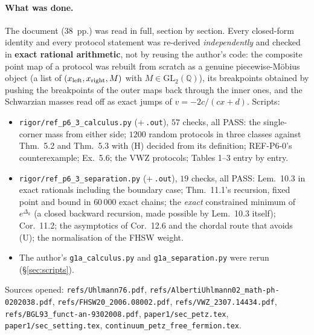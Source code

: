 \documentclass[11pt]{article}
\theoremstyle{definition}\newtheorem{example}[theorem]{Example}
\begin{document}
\paragraph{What was done.}
The document (38~pp.) was read in full, section by section.  Every closed-form identity
and every protocol statement was re-derived \emph{independently} and checked in
\textbf{exact rational arithmetic}, not by reusing the author's code: the composite point
map of a protocol was rebuilt from scratch as a genuine piecewise-M\"obius object (a list
of $(x_{\rm left},x_{\rm right},M)$ with $M\in\mathrm{GL}_2(\mathbb Q)$), its breakpoints
obtained by pushing the breakpoints of the outer maps back through the inner ones, and the
Schwarzian masses read off as exact jumps of $v=-2c/(cx+d)$.  Scripts:
\begin{itemize}[leftmargin=2em,nosep]
\item \texttt{rigor/ref\_p6\_3\_calculus.py} (+\,\texttt{.out}), $57$ checks, all PASS:
 the single-corner mass from either side; $1200$ random protocols in three classes against
 Thm.~5.2 and Thm.~5.3 with (H) decided from its definition; REF-P6-0's counterexample;
 Ex.~5.6; the VWZ protocols; Tables 1--3 entry by entry.
\item \texttt{rigor/ref\_p6\_3\_separation.py} (+\,\texttt{.out}), $19$ checks, all PASS:
 Lem.~10.3 in exact rationals including the boundary case; Thm.~11.1's recursion, fixed
 point and bound in $60\,000$ exact chains; the \emph{exact} constrained minimum of
 $e^{\Delta_k}$ (a closed backward recursion, made possible by Lem.~10.3 itself);
 Cor.~11.2; the asymptotics of Cor.~12.6 and the chordal route that avoids (U); the
 normalisation of the FHSW weight.
\item The author's \texttt{g1a\_calculus.py} and \texttt{g1a\_separation.py} were rerun
 (\S\ref{sec:scripts}).
\end{itemize}
Sources opened: \texttt{refs/Uhlmann76.pdf}, \texttt{refs/AlbertiUhlmann02\_math-ph-0202038.pdf},
\texttt{refs/FHSW20\_2006.08002.pdf}, \texttt{refs/VWZ\_2307.14434.pdf},
\texttt{refs/BGL93\_funct-an-9302008.pdf}, \texttt{paper1/sec\_petz.tex},
\texttt{paper1/sec\_setting.tex}, \texttt{continuum\_petz\_free\_fermion.tex}.
\end{document}
